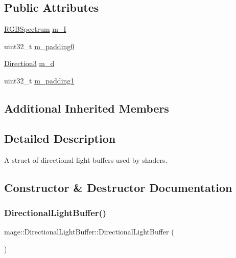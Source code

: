 \subsection*{Public Attributes}
\begin{DoxyCompactItemize}
\item 
\hyperlink{structmage_1_1_r_g_b_spectrum}{R\+G\+B\+Spectrum} \hyperlink{structmage_1_1_directional_light_buffer_a357b86deb8ed2926cb77ed8191e967e6}{m\+\_\+I}
\item 
uint32\+\_\+t \hyperlink{structmage_1_1_directional_light_buffer_af2e82dd3f47a965e009db19da9fb5167}{m\+\_\+padding0}
\item 
\hyperlink{structmage_1_1_direction3}{Direction3} \hyperlink{structmage_1_1_directional_light_buffer_a592ac44133a2b851d350a9f9ad2c4788}{m\+\_\+d}
\item 
uint32\+\_\+t \hyperlink{structmage_1_1_directional_light_buffer_a81074641afb7ae296f7c6ee1b3fb12a2}{m\+\_\+padding1}
\end{DoxyCompactItemize}
\subsection*{Additional Inherited Members}


\subsection{Detailed Description}
A struct of directional light buffers used by shaders. 

\subsection{Constructor \& Destructor Documentation}
\hypertarget{structmage_1_1_directional_light_buffer_a73a87ba7b016b6c62375da62b4fdf7b6}{}\label{structmage_1_1_directional_light_buffer_a73a87ba7b016b6c62375da62b4fdf7b6} 
\subsubsection{\texorpdfstring{Directional\+Light\+Buffer()}{DirectionalLightBuffer()}\hspace{0.1cm}{\footnotesize\ttfamily [1/3]}}
{\footnotesize\ttfamily mage\+::\+Directional\+Light\+Buffer\+::\+Directional\+Light\+Buffer (\begin{DoxyParamCaption}{ }\end{DoxyParamCaption})}

